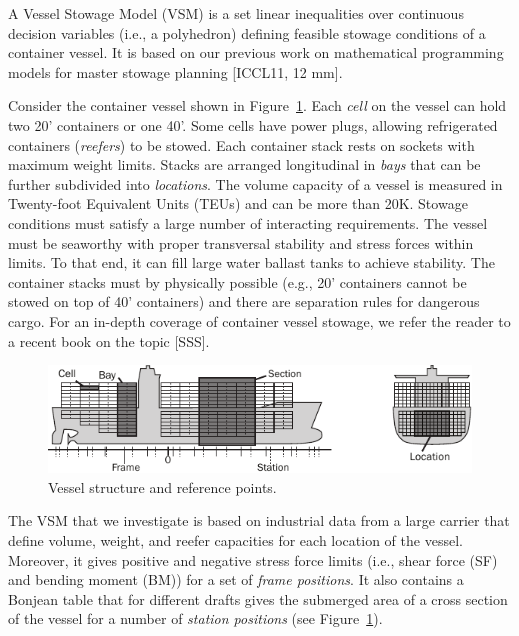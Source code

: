 \documentclass{llncs}
\begin{document}
A Vessel Stowage Model (VSM) is a set linear inequalities over continuous decision variables (i.e., a polyhedron) defining feasible stowage conditions of a container vessel. It is based on our previous work on mathematical programming models for master stowage planning [ICCL11, 12 mm]. 

Consider the container vessel shown in Figure~\ref{fig:vessel}. Each \emph{cell} on the vessel can hold two 20' containers or one 40'. Some cells have power plugs, allowing refrigerated containers (\emph{reefers}) to be stowed. Each container stack rests on sockets with maximum weight limits. Stacks are arranged longitudinal in \emph{bays} that can be further subdivided into \emph{locations}. The volume capacity of a vessel is measured in Twenty-foot Equivalent Units (TEUs) and can be more than 20K. Stowage conditions must satisfy a large number of interacting requirements. The vessel must be seaworthy with proper transversal stability and stress forces within limits. To that end, it can fill large water ballast tanks to achieve stability. The container stacks must by physically possible (e.g., 20' containers cannot be stowed on top of 40' containers) and there are separation rules for dangerous cargo. For an in-depth coverage of container vessel stowage, we refer the reader to a recent book on the topic [SSS].     
\begin{figure}[h!]
	\centering
		\includegraphics{figures/vessel4.pdf}
	\caption{Vessel structure and reference points.}
	\label{fig:vessel}
\end{figure}



The VSM that we investigate is based on industrial data from a large carrier that define volume, weight, and reefer capacities for each location of the vessel. Moreover, it gives positive and negative stress force limits (i.e., shear force (SF) and bending moment (BM)) for a set of \emph{frame positions}. It also contains a Bonjean table that for different drafts gives the submerged area of a cross section of the vessel for a number of \emph{station positions} (see Figure~\ref{fig:vessel}). 
\end{document}

